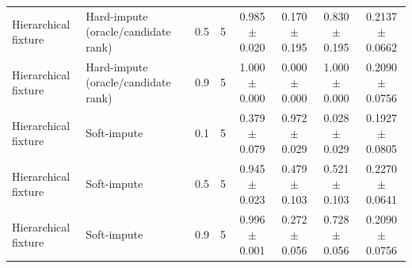 {\begin{tabular}{llcccccc}
Hierarchical fixture & Hard-impute (oracle/candidate rank) & 0.5 & 5 & 0.985 $\pm$ 0.020 & 0.170 $\pm$ 0.195 & 0.830 $\pm$ 0.195 & 0.2137 $\pm$ 0.0662 \\
Hierarchical fixture & Hard-impute (oracle/candidate rank) & 0.9 & 5 & 1.000 $\pm$ 0.000 & 0.000 $\pm$ 0.000 & 1.000 $\pm$ 0.000 & 0.2090 $\pm$ 0.0756 \\
Hierarchical fixture & Soft-impute & 0.1 & 5 & 0.379 $\pm$ 0.079 & 0.972 $\pm$ 0.029 & 0.028 $\pm$ 0.029 & 0.1927 $\pm$ 0.0805 \\
Hierarchical fixture & Soft-impute & 0.5 & 5 & 0.945 $\pm$ 0.023 & 0.479 $\pm$ 0.103 & 0.521 $\pm$ 0.103 & 0.2270 $\pm$ 0.0641 \\
Hierarchical fixture & Soft-impute & 0.9 & 5 & 0.996 $\pm$ 0.001 & 0.272 $\pm$ 0.056 & 0.728 $\pm$ 0.056 & 0.2090 $\pm$ 0.0756 \\
\bottomrule
\end{tabular}
}
